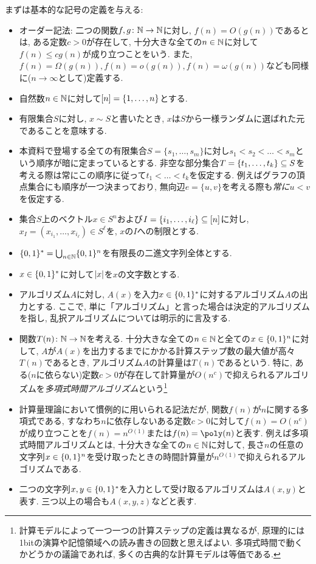 まずは基本的な記号の定義を与える:
\begin{itemize}
\item オーダー記法: 二つの関数$f,g\colon\mathbb{N}\to\mathbb{N}$に対し, $f(n)=O(g(n))$であるとは, ある定数$c>0$が存在して, 十分大きな全ての$n\in\mathbb{N}$に対して$f(n)\le cg(n)$が成り立つことをいう. また, $f(n)=\Omega(g(n)), f(n)=o(g(n)), f(n)=\omega(g(n))$なども同様に($n\to\infty$として)定義する.
\item 自然数$n\in\mathbb{N}$に対して$[n]=\qty{1,\dots,n}$とする.
\item 有限集合$S$に対し, $x\sim S$と書いたとき, $x$は$S$から一様ランダムに選ばれた元であることを意味する.
\item 本資料で登場する全ての有限集合$S=\{s_1,\dots,s_m\}$に対し$s_1<s_2<\dots<s_m$という順序が暗に定まっているとする. 非空な部分集合$T=\qty{t_1,\dots,t_k}\subseteq S$を考える際は常にこの順序に従って$t_1<\dots<t_k$を仮定する. 例えばグラフの頂点集合にも順序が一つ決まっており, 無向辺$e=\{u,v\}$を考える際も\emph{常に}$u<v$を仮定する.
\item 集合$S$上のベクトル$x\in S^n$および$I=\qty{i_1,\dots,i_\ell}\subseteq[n]$に対し, $x_I=(x_{i_1},\dots,x_{i_\ell}) \in S^{\ell}$を, $x$の$I$への制限とする.
\item $\{0,1\}^*=\bigcup_{n\in\mathbb{N}}\{0,1\}^n$を有限長の二進文字列全体とする.
\item $x\in\{0,1\}^*$に対して$\abs{x}$を$x$の文字数とする.
\item アルゴリズム$A$に対し, $A(x)$を入力$x \in \{0,1\}^*$に対するアルゴリズム$A$の出力とする. ここで, 単に「アルゴリズム」と言った場合は決定的アルゴリズムを指し, 乱択アルゴリズムについては明示的に言及する.
\item 関数$T(n)\colon\mathbb{N}\to\mathbb{N}$を考える. 十分大きな全ての$n\in\mathbb{N}$と全ての$x\in\{0,1\}^n$に対して, $A$が$A(x)$を出力するまでにかかる計算ステップ数の最大値が高々$T(n)$であるとき, アルゴリズム$A$の計算量は$T(n)$であるという. 特に, ある($n$に依らない)定数$c>0$が存在して計算量が$O(n^c)$で抑えられるアルゴリズムを\emph{多項式時間アルゴリズム}という\footnote{計算モデルによって一つ一つの計算ステップの定義は異なるが, 原理的には1bitの演算や記憶領域への読み書きの回数と思えばよい. 多項式時間で動くかどうかの議論であれば, 多くの古典的な計算モデルは等価である.}
\item 計算量理論において慣例的に用いられる記法だが, 関数$f(n)$が$n$に関する多項式である, すなわち$n$に依存しないある定数$c>0$に対して$f(n)=O(n^c)$が成り立つことを$f(n)=n^{O(1)}$または$f(n)=\poly(n)$と表す. 例えば多項式時間アルゴリズムとは, 十分大きな全ての$n\in\mathbb{N}$に対して, 長さ$n$の任意の文字列$x\in\{0,1\}^n$を受け取ったときの時間計算量が$n^{O(1)}$で抑えられるアルゴリズムである.
\item 二つの文字列$x,y\in\{0,1\}^*$を入力として受け取るアルゴリズムは$A(x,y)$と表す. 三つ以上の場合も$A(x,y,z)$などと表す.
\end{itemize}

